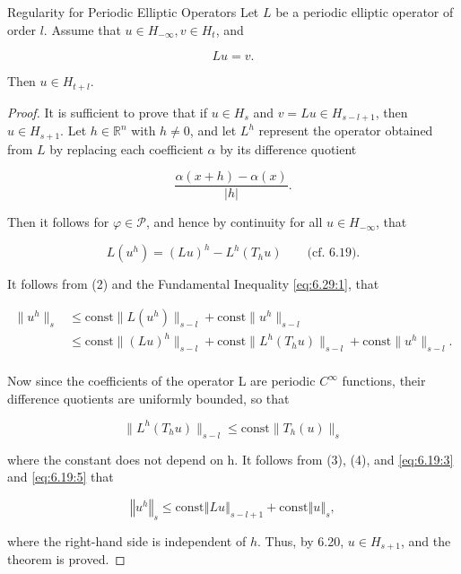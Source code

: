 \begin{theorem}{Regularity for Periodic Elliptic Operators}\label{thm:6.30}
Let $L$ be a periodic elliptic operator of order $l$. Assume that $u \in H_{-\infty}, v \in H_{t}$, and

\begin{equation}
\tag{1}\label{eq:6.30:1}
Lu=v.
\end{equation}

Then $u \in H_{t+l}$.

\end{theorem}

\begin{proof}
It is sufficient to prove that if  $ u \in H_s $ and  $ v = Lu \in H_{s-l+1} $, then  $ u \in H_{s+1} $. Let  $ h \in \mathbb{R}^n $ with  $ h \neq 0 $, and let  $ L^h $ represent the operator obtained from  $ L $ by replacing each coefficient  $ \alpha $ by its difference quotient

\[
\frac{\alpha(x+h)-\alpha(x)}{|h|}.
\]

Then it follows for  $ \varphi \in \mathcal{P} $, and hence by continuity for all  $ u \in H_{-\infty} $, that

\begin{equation}
\tag{2}\label{eq:6.30:2}
L(u^{h})=(L u)^{h}-L^{h}(T_{h}u)\qquad\text{(cf. 6.19).}
\end{equation}

It follows from (2) and the Fundamental Inequality \eqref{eq:6.29:1}, that

\begin{equation}
\tag{3}\label{eq:6.30:3}
\begin{aligned}{\|u^{h}\|_{s}}&{{}\leq\mathrm{const}\|L(u^{h})\|_{s-l}+\mathrm{const}\|u^{h}\|_{s-l}}\\ {}&{{}\leq\mathrm{const}\|(L u)^{h}\|_{s-l}+\mathrm{const}\|L^{h}(T_{h}u)\|_{s-l}+\mathrm{const}\|u^{h}\|_{s-l}.}\\ \end{aligned}
\end{equation}

Now since the coefficients of the operator L are periodic  $ C^{\infty} $ functions, their difference quotients are uniformly bounded, so that

\begin{equation}
\tag{4}\label{eq:6.30:4}
\|L^{h}(T_{h}u)\|_{s-l}\leq\mathrm{const}\|T_{h}(u)\|_{s}
\end{equation}

where the constant does not depend on h. It follows from (3), (4), and \eqref{eq:6.19:3} and \eqref{eq:6.19:5} that

\[
\left\Vert{u^{h}}\right\Vert_{s}\leq\mathrm{const}\left\Vert{L u}\right\Vert_{s-l+1}+\mathrm{const}\left\Vert{u}\right\Vert_{s},
\]

where the right-hand side is independent of $h$. Thus, by 6.20, $u \in H_{s+1}$, and the theorem is proved.

\end{proof}

